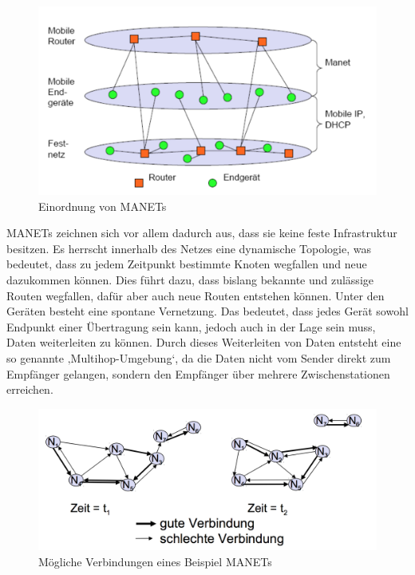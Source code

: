 \begin{figure}[H] 
	\centering
	\includegraphics[scale=0.5]{Bilder/manet}
	\caption{Einordnung von MANETs\cite{d:timm}}
	\label{f:manet}
\end{figure}

MANETs zeichnen sich vor allem dadurch aus, dass sie keine feste Infrastruktur besitzen. Es herrscht innerhalb des Netzes eine dynamische Topologie, was bedeutet, dass zu jedem Zeitpunkt bestimmte Knoten wegfallen und neue dazukommen können. Dies führt dazu, dass bislang bekannte und zulässige Routen wegfallen, dafür aber auch neue Routen entstehen können. Unter den Geräten besteht eine spontane Vernetzung. Das bedeutet, dass jedes Gerät sowohl Endpunkt einer Übertragung sein kann, jedoch auch in der Lage sein muss, Daten weiterleiten zu können. Durch dieses Weiterleiten von Daten entsteht eine so genannte ‚Multihop-Umgebung‘, da die Daten nicht vom Sender direkt zum Empfänger gelangen, sondern den Empfänger über mehrere Zwischenstationen erreichen. \\

\begin{figure}[H] 
	\centering
	\includegraphics[scale=0.5]{Bilder/manetconnection}
	\caption{Mögliche Verbindungen eines Beispiel MANETs\cite{d:timm}}
	\label{f:manetconnection}
\end{figure}

